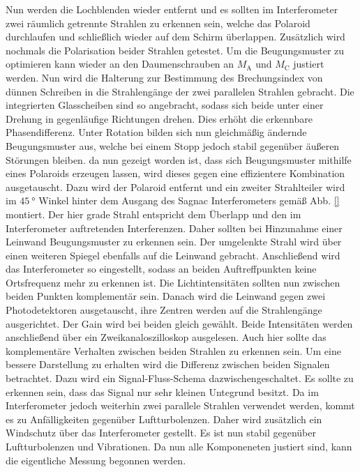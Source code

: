 Nun werden die Lochblenden wieder entfernt und es sollten im Interferometer zwei räumlich getrennte Strahlen zu erkennen sein, welche das Polaroid durchlaufen und schließlich wieder auf dem Schirm überlappen. Zusätzlich wird nochmals die Polarisation beider Strahlen getestet. Um die Beugungsmuster zu optimieren kann wieder an den Daumenschrauben an $M_\text{A}$ und $M_\text{C}$ justiert werden.
Nun wird die Halterung zur Bestimmung des Brechungsindex von dünnen Schreiben in die Strahlengänge der zwei parallelen Strahlen gebracht. Die integrierten Glasscheiben sind so angebracht, sodass sich beide unter einer Drehung in gegenläufige Richtungen drehen. Dies erhöht die erkennbare Phasendifferenz. Unter Rotation bilden sich nun gleichmäßig ändernde Beugungsmuster aus, welche bei einem Stopp jedoch stabil gegenüber äußeren Störungen bleiben.
da nun gezeigt worden ist, dass sich Beugungsmuster mithilfe eines Polaroids erzeugen lassen, wird dieses gegen eine effizientere Kombination ausgetauscht. Dazu wird der Polaroid entfernt und ein zweiter Strahlteiler wird im $\SI{45}{\degree}$ Winkel hinter dem Ausgang des Sagnac Interferometers gemäß Abb. \ref{} montiert. Der hier grade Strahl entspricht dem Überlapp und den im Interferometer auftretenden Interferenzen. Daher sollten bei Hinzunahme einer Leinwand Beugungsmuster zu erkennen sein. Der umgelenkte Strahl wird über einen weiteren Spiegel ebenfalls auf die Leinwand gebracht. Anschließend wird das Interferometer so eingestellt, sodass an beiden Auftreffpunkten keine Ortsfrequenz mehr zu erkennen ist. Die Lichtintensitäten sollten nun zwischen beiden Punkten komplementär sein. Danach wird die Leinwand gegen zwei Photodetektoren ausgetauscht, ihre Zentren werden auf die Strahlengänge ausgerichtet. Der Gain wird bei beiden gleich gewählt. Beide Intensitäten werden anschließend über ein Zweikanaloszilloskop ausgelesen. Auch hier sollte das komplementäre Verhalten zwischen beiden Strahlen zu erkennen sein. Um eine bessere Darstellung zu erhalten wird die Differenz zwischen beiden Signalen betrachtet. Dazu wird ein Signal-Fluss-Schema dazwischengeschaltet. Es sollte zu erkennen sein, dass das Signal nur sehr kleinen Untegrund besitzt. Da im Interferometer jedoch weiterhin zwei parallele Strahlen verwendet werden, kommt es zu Anfälligkeiten gegenüber Luftturbolenzen. Daher wird zusätzlich ein Windschutz über das Interferometer gestellt. Es ist nun stabil gegenüber Luftturbolenzen und Vibrationen. Da nun alle Komponeneten justiert sind, kann die eigentliche Messung begonnen werden. 